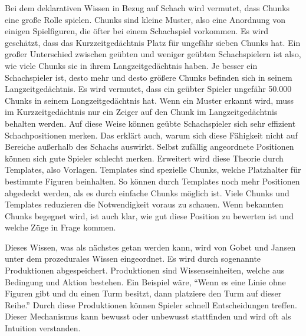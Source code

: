 Bei dem deklarativen Wissen in Bezug auf Schach wird vermutet, dass Chunks eine große Rolle spielen. Chunks sind kleine Muster, also eine Anordnung von einigen Spielfiguren, die öfter bei einem Schachspiel vorkommen. Es wird geschätzt, dass das Kurzzeitgedächtnis Platz für ungefähr sieben Chunks hat. Ein großer Unterschied zwischen geübten und weniger geübten Schachspielern ist also, wie viele Chunks sie in ihrem Langzeitgedächtnis haben. Je besser ein Schachspieler ist, desto mehr und desto größere Chunks befinden sich in seinem Langzeitgedächtnis. Es wird vermutet, dass ein geübter Spieler ungefähr 50.000 Chunks in seinem Langzeitgedächtnis hat. Wenn ein Muster erkannt wird, muss im Kurzzeitgedächtnis nur ein Zeiger auf den Chunk im Langzeitgedächtnis behalten werden. Auf diese Weise können geübte Schachspieler sich sehr effizient Schachpositionen merken. Das erklärt auch, warum sich diese Fähigkeit nicht auf Bereiche außerhalb des Schachs auswirkt. Selbst zufällig angeordnete Positionen können sich gute Spieler schlecht merken. Erweitert wird diese Theorie durch Templates, also Vorlagen. Templates sind spezielle Chunks, welche Platzhalter für bestimmte Figuren beinhalten. So können durch Templates noch mehr Positionen abgedeckt werden, als es durch einfache Chunks möglich ist. Viele Chunks und Templates reduzieren die Notwendigkeit voraus zu schauen. Wenn bekannten Chunks begegnet wird, ist auch klar, wie gut diese Position zu bewerten ist und welche Züge in Frage kommen.
\cite{gobet_templates_1996}

Dieses Wissen, was als nächstes getan werden kann, wird von Gobet und Jansen unter dem prozedurales Wissen eingeordnet. Es wird durch sogenannte Produktionen abgespeichert. Produktionen sind Wissenseinheiten, welche aus Bedingung und Aktion bestehen. Ein Beispiel wäre, \enquote{Wenn es eine Linie ohne Figuren gibt und du einen Turm besitzt, dann platziere den Turm auf dieser Reihe.} Durch diese Produktionen können Spieler schnell Entscheidungen treffen. Dieser Mechanismus kann bewusst oder unbewusst stattfinden und wird oft als Intuition verstanden.
\cite{gobet_training_2006}

